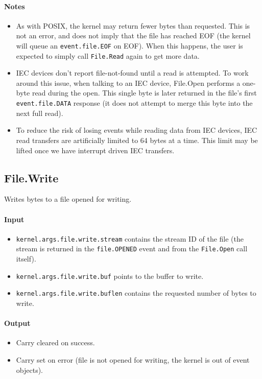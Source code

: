 \paragraph{Notes}
\begin{itemize}
\item As with POSIX, the kernel may return fewer bytes than requested.  This is not an error, and does not imply that the file has reached EOF (the kernel will queue an \verb+event.file.EOF+ on EOF).  When this happens, the user is expected to simply call \verb+File.Read+ again to get more data.

\item IEC devices don't report file-not-found until a read is attempted.  To work around this issue, when talking to an IEC device, File.Open performs a one-byte read during the open.  This single byte is later returned in the file's first \verb+event.file.DATA+ response (it does not attempt to merge this byte into the next full read).  

\item To reduce the risk of losing events while reading data from IEC devices, IEC read transfers are artificially limited to 64 bytes at a time.  This limit may be lifted once we have interrupt driven IEC transfers.
\end{itemize}

\subsection*{File.Write}
Writes bytes to a file opened for writing.

\paragraph{Input}
\begin{itemize}
\item \verb+kernel.args.file.write.stream+ contains the stream ID of the file (the stream is returned in the \verb+file.OPENED+ event and from the \verb+File.Open+ call itself).
\item \verb+kernel.args.file.write.buf+ points to the buffer to write.
\item \verb+kernel.args.file.write.buflen+ contains the requested number of bytes to write.
\end{itemize}

\paragraph{Output}
\begin{itemize}
\item Carry cleared on success.
\item Carry set on error (file is not opened for writing, the kernel is out of event objects).
\end{itemize}

